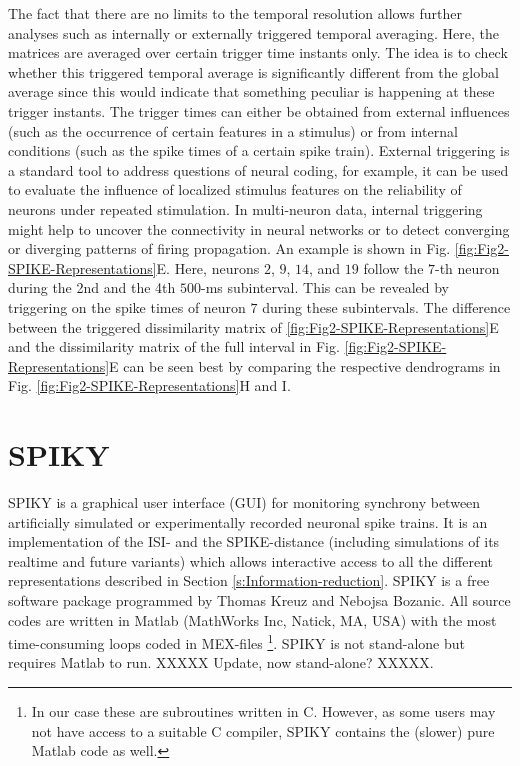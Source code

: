 \documentclass[10pt,twocolumn]{elsart5p}
\begin{document}
The fact that there are no limits to the temporal resolution allows further analyses such as internally or externally triggered temporal averaging. Here, the matrices are averaged over certain trigger time instants only. The idea is to check whether this triggered temporal average is significantly different from the global average since this would indicate that something peculiar is happening at these trigger instants. The trigger times can either be obtained from external influences (such as the occurrence of certain features in a stimulus) or from internal conditions (such as the spike times of a certain spike train). External triggering is a standard tool to address questions of neural coding, for example, it can be used to evaluate the influence of localized stimulus features on the reliability of neurons under repeated stimulation. In multi-neuron data, internal triggering might help to uncover the connectivity in neural networks or to detect converging or diverging patterns of firing propagation. An example is shown in Fig. \ref{fig:Fig2-SPIKE-Representations}E. Here, neurons $2$, $9$, $14$, and $19$ follow the $7$-th neuron during the 2nd and the 4th $500$-ms subinterval. This can be revealed by triggering on the spike times of neuron $7$ during these subintervals. The difference between the triggered dissimilarity matrix of \ref{fig:Fig2-SPIKE-Representations}E and the dissimilarity matrix of the full interval in Fig. \ref{fig:Fig2-SPIKE-Representations}E can be seen best by comparing the respective dendrograms in Fig. \ref{fig:Fig2-SPIKE-Representations}H and I.

%
%
%
%
\section{\label{s:SPIKY} SPIKY}

SPIKY is a graphical user interface (GUI) for monitoring synchrony between artificially simulated or experimentally recorded neuronal spike trains. It is an implementation of the ISI- and the SPIKE-distance (including simulations of its realtime and future variants) which allows  interactive access to all the different representations described in Section \ref{s:Information-reduction}. SPIKY is a free software package programmed by Thomas Kreuz and Nebojsa Bozanic. All source codes are written in Matlab (MathWorks Inc, Natick, MA, USA) with the most time-consuming loops coded in MEX-files \footnote{In our case these are subroutines written in C. However, as some users may not have access to a suitable C compiler, SPIKY contains the (slower) pure Matlab code as well.}. SPIKY is not stand-alone but requires Matlab to run. XXXXX Update, now stand-alone? XXXXX.
\end{document}

